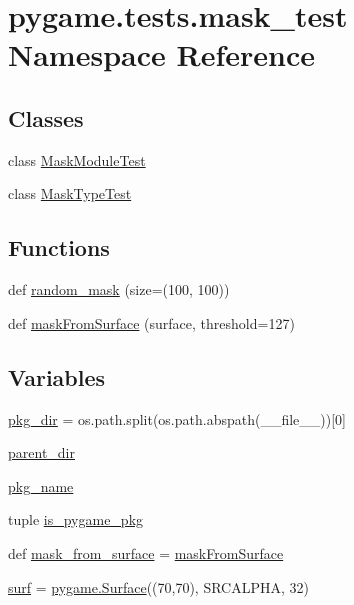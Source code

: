 \hypertarget{namespacepygame_1_1tests_1_1mask__test}{}\section{pygame.\+tests.\+mask\+\_\+test Namespace Reference}
\label{namespacepygame_1_1tests_1_1mask__test}
\subsection*{Classes}
\begin{DoxyCompactItemize}
\item 
class \hyperlink{classpygame_1_1tests_1_1mask__test_1_1_mask_module_test}{Mask\+Module\+Test}
\item 
class \hyperlink{classpygame_1_1tests_1_1mask__test_1_1_mask_type_test}{Mask\+Type\+Test}
\end{DoxyCompactItemize}
\subsection*{Functions}
\begin{DoxyCompactItemize}
\item 
def \hyperlink{namespacepygame_1_1tests_1_1mask__test_adaa7ea77381e6d5927f3cee6d896ce07}{random\+\_\+mask} (size=(100, 100))
\item 
def \hyperlink{namespacepygame_1_1tests_1_1mask__test_a3a26e566abd32ac042670407f459b57b}{mask\+From\+Surface} (surface, threshold=127)
\end{DoxyCompactItemize}
\subsection*{Variables}
\begin{DoxyCompactItemize}
\item 
\hyperlink{namespacepygame_1_1tests_1_1mask__test_a1694a9551bd179da91cce7f3b135d558}{pkg\+\_\+dir} = os.\+path.\+split(os.\+path.\+abspath(\+\_\+\+\_\+file\+\_\+\+\_\+))\mbox{[}0\mbox{]}
\item 
\hyperlink{namespacepygame_1_1tests_1_1mask__test_a3dda8dae37fc5548320463a180cc1ff4}{parent\+\_\+dir}
\item 
\hyperlink{namespacepygame_1_1tests_1_1mask__test_a3f729fc17e584f7a093ba7b4ef1a57e5}{pkg\+\_\+name}
\item 
tuple \hyperlink{namespacepygame_1_1tests_1_1mask__test_a4e4e9c35953c74406708411dd8c103e2}{is\+\_\+pygame\+\_\+pkg}
\item 
def \hyperlink{namespacepygame_1_1tests_1_1mask__test_a918806351c5eb8b82fc4f3dccc2fe32e}{mask\+\_\+from\+\_\+surface} = \hyperlink{namespacepygame_1_1tests_1_1mask__test_a3a26e566abd32ac042670407f459b57b}{mask\+From\+Surface}
\item 
\hyperlink{namespacepygame_1_1tests_1_1mask__test_af918d60df301633353be32e254f43d51}{surf} = \hyperlink{namespacepygame_af987790424fd0631c88919974993d66e}{pygame.\+Surface}((70,70), S\+R\+C\+A\+L\+P\+HA, 32)
\end{DoxyCompactItemize}



